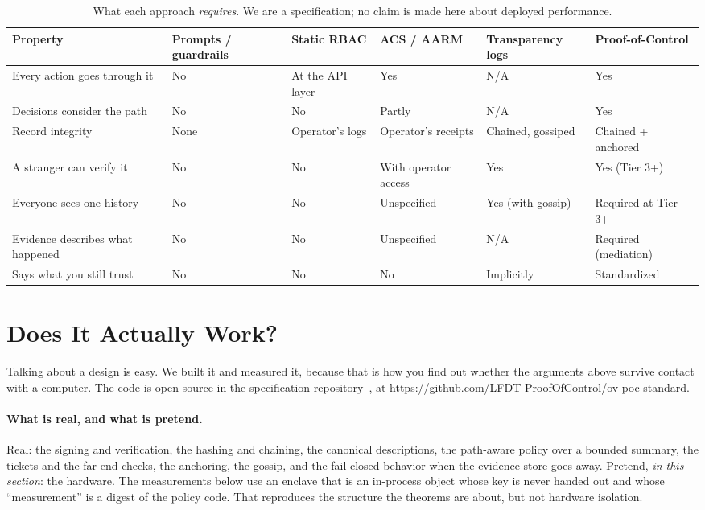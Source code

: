 \documentclass[11pt]{article}
\newcommand{\poc}{Proof-of-Control}
\begin{document}
\begin{table}[ht]
\centering\footnotesize
\begin{tabular}{@{}p{2.35cm}p{2.2cm}p{2.2cm}p{2.4cm}p{2.4cm}p{2.4cm}@{}}
\toprule
\textbf{Property} & \textbf{Prompts / guardrails} & \textbf{Static RBAC} & %
\textbf{ACS / AARM} & \textbf{Transparency logs} & \textbf{\poc{}} \\
\midrule
Every action goes through it & No & At the API layer & Yes & N/A & Yes \\
Decisions consider the path & No & No & Partly & N/A & Yes \\
Record integrity & None & Operator's logs & Operator's receipts &
Chained, gossiped & Chained + anchored \\
A stranger can verify it & No & No & With operator access & Yes &
Yes (Tier 3+) \\
Everyone sees one history & No & No & Unspecified & Yes (with gossip) &
Required at Tier 3+ \\
Evidence describes what happened & No & No & Unspecified & N/A &
Required (mediation) \\
Says what you still trust & No & No & No & Implicitly & Standardized \\
\bottomrule
\end{tabular}
\caption{What each approach \emph{requires}. We are a specification; no claim
is made here about deployed performance.}
\label{tab:compare}
\end{table}

\section{Does It Actually Work?}
\label{sec:eval}

Talking about a design is easy. We built it and measured it, because that is
how you find out whether the arguments above survive contact with a
computer. The code is open source in the specification
repository~\cite{pocspec}, at \url{https://github.com/LFDT-ProofOfControl/ov-poc-standard}.

\paragraph{What is real, and what is pretend.} Real: the signing and
verification, the hashing and chaining, the canonical descriptions, the
path-aware policy over a bounded summary, the tickets and the far-end checks,
the anchoring, the gossip, and the fail-closed behavior when the evidence
store goes away. Pretend, \emph{in this section}: the hardware. The
measurements below use an enclave that is an in-process object whose key is
never handed out and whose ``measurement'' is a digest of the policy code. That
reproduces the structure the theorems are about, but not hardware isolation.
\end{document}
